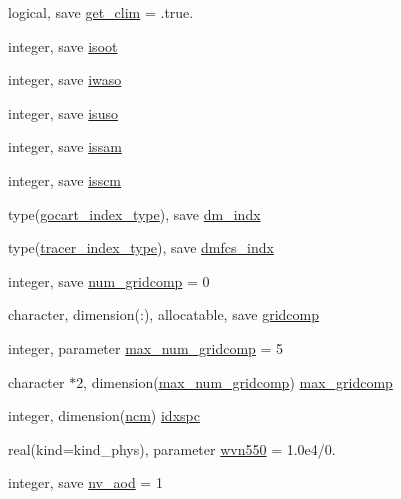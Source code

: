 \begin{DoxyCompactItemize}
\item 
logical, save \hyperlink{group__module__radiation__aerosols_ga7fe1943010fe47c9d86ef4c993848459}{get\+\_\+clim} = .true.
\item 
integer, save \hyperlink{group__module__radiation__aerosols_gaa9aa876f65d1e1e971607bff4ffbddad}{isoot}
\item 
integer, save \hyperlink{group__module__radiation__aerosols_gad15292f4a185c28ad44687d95ef4d3a4}{iwaso}
\item 
integer, save \hyperlink{group__module__radiation__aerosols_gacddb4dccea82201fd3b193c15c85ec78}{isuso}
\item 
integer, save \hyperlink{group__module__radiation__aerosols_gab64435256571a80bbb577fc4f27b39ee}{issam}
\item 
integer, save \hyperlink{group__module__radiation__aerosols_ga762cff73e22fefab8adf68d08d5c4df1}{isscm}
\item 
type(\hyperlink{structmodule__radiation__aerosols_1_1gocart__index__type}{gocart\+\_\+index\+\_\+type}), save \hyperlink{group__module__radiation__aerosols_ga70c58693c0aac6e4dbb6cf425fb0ce6a}{dm\+\_\+indx}
\item 
type(\hyperlink{structmodule__radiation__aerosols_1_1tracer__index__type}{tracer\+\_\+index\+\_\+type}), save \hyperlink{group__module__radiation__aerosols_gad6c4782fbaae13df20891197b67568ec}{dmfcs\+\_\+indx}
\item 
integer, save \hyperlink{group__module__radiation__aerosols_ga6ddeb7b34ad2d6ab1575be3520e85891}{num\+\_\+gridcomp} = 0
\item 
character, dimension(\+:), allocatable, save \hyperlink{group__module__radiation__aerosols_ga48c2c6c9c509f5c37fea5d788040ad7a}{gridcomp}
\item 
integer, parameter \hyperlink{group__module__radiation__aerosols_gad1187b5d87889c68cbe5929e20e83ac7}{max\+\_\+num\+\_\+gridcomp} = 5
\item 
character $\ast$2, dimension(\hyperlink{group__module__radiation__aerosols_gad1187b5d87889c68cbe5929e20e83ac7}{max\+\_\+num\+\_\+gridcomp}) \hyperlink{group__module__radiation__aerosols_gac8278b0db773d6ba6ab4d71c9bb1b109}{max\+\_\+gridcomp}
\item 
integer, dimension(\hyperlink{group__module__radiation__aerosols_gab46e61a4a386794a5e9e97d8ef7d98a5}{ncm}) \hyperlink{group__module__radiation__aerosols_ga8ca79ca1e5161374aff3cad4121b360f}{idxspc}
\item 
real(kind=kind\+\_\+phys), parameter \hyperlink{group__module__radiation__aerosols_ga4555a127ac5bab48353628ea81c55e4e}{wvn550} = 1.\+0e4/0.
\item 
integer, save \hyperlink{group__module__radiation__aerosols_ga112670c954eb372efc017253b1096b17}{nv\+\_\+aod} = 1
\end{DoxyCompactItemize}



